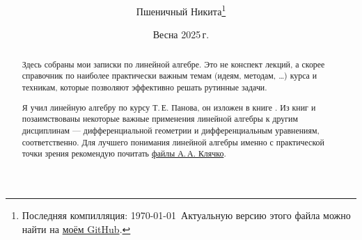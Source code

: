 \documentclass[a4paper, twoside, leqno, 11pt]{article}
\begin{document}
\title{\bfseries\scshape\course}
\date{Весна 2025\,г.}
\author{Пшеничный Никита\thanks{Последняя компилляция: \today\ Актуальную версию этого файла можно найти на \href{https://github.com/pshenikita/Linear-Algebra}{моём GitHub}.}}

\maketitle
\begin{abstract}
	Здесь собраны мои записки по линейной алгебре. Это не конспект лекций, а скорее справочник по наиболее практически важным темам (идеям, методам, \ldots) курса и техникам, которые позволяют эффективно решать рутинные задачи.

	Я учил линейную алгебру по курсу Т.\,Е. Панова, он изложен в книге \cite{P24}. Из книг \cite{NT14} и \cite{A24} позаимствованы некоторые важные применения линейной алгебры к другим дисциплинам --- дифференциальной геометрии и дифференциальным уравнениям, соответственно. Для лучшего понимания линейной алгебры именно с практической точки зрения рекомендую почитать \href{http://halgebra.math.msu.su/wiki/doku.php/klyachko-v24}{файлы А.\,А. Клячко}.

	
\end{abstract}

\tableofcontents


\end{document}

